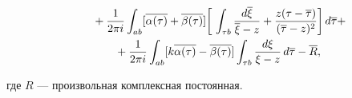 \begin{lem}
\begin{align}
%


&\qquad + \frac{1}{2\pi i}\int_{ab} [\overline{\alpha(\tau)}


+\overline{\beta(\tau)}]


\bigg[\,


\int_{\tau b}\frac{d\overline{\xi}}{\overline{\xi}-z}


+ \frac{z(\tau-\overline{\tau})}{(\overline{\tau}-z)^2}


\bigg]\,d\overline{\tau} + \notag \\


%


&\qquad\qquad + \frac{1}{2\pi i}\int_{ab} [k\overline{\alpha(\tau)}


-\overline{\beta(\tau)}]


\int_{\tau b}\frac{d\xi}{\xi-z}\,d\overline{\tau}


- \overline{R},


\end{align}


где $R$ --- произвольная комплексная постоянная.


\end{lem}





